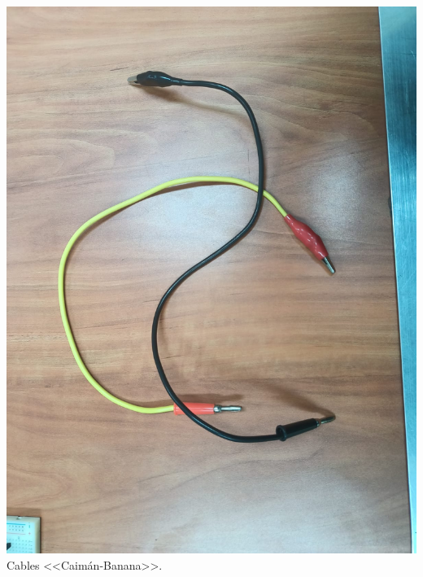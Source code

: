 \documentclass[10pt]{article}
\begin{document}
\begin{multicols}{2}
\begin{center}
	\includegraphics[scale = 0.1]{Imagenes/Material/Caimanban.jpeg}\\
	Cables <<Caimán-Banana>>.


\end{center}
\end{multicols}
\end{document}

